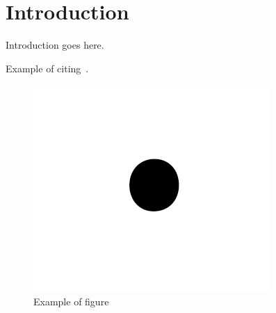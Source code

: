 \section{Introduction}

Introduction goes here.

Example of citing~\cite{291164}.











\begin{figure}[ht]
  \centering
  \includegraphics[width=\columnwidth]{figures/occupy.pdf}
  \caption{\label{fig:label} Example of figure}
\end{figure}

